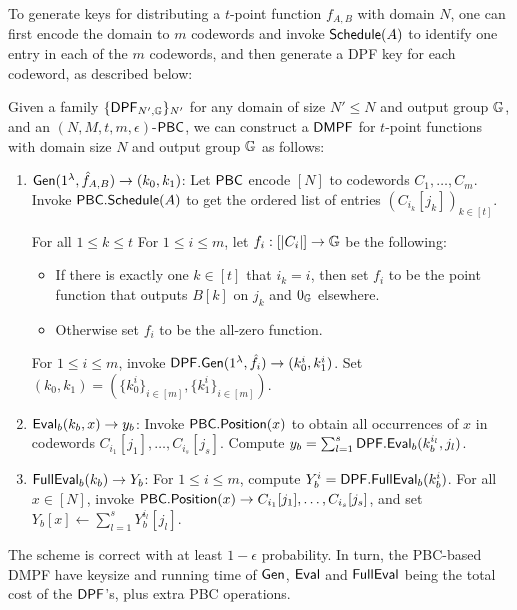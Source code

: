 To generate keys for distributing a $t$-point function $f_{A,B}$ with domain $N$, one can first encode the domain to $m$ codewords and invoke ${\sf Schedule}(A)$ to identify one entry in each of the $m$ codewords, and then generate a DPF key for each codeword, as described below: 

\begin{construction}\label{con:DMPF_PBC}
    Given a family $\{{\sf DPF}_{N',\mathbb{G}}\}_{N'}$ for any domain of size $N'\le N$ and output group $\mathbb{G}$, and an $(N,M,t,m,\epsilon)$-${\sf PBC}$, we can construct a ${\sf DMPF}$ for $t$-point functions with domain size $N$ and output group $\mathbb{G}$ as follows: 
  \begin{enumerate}[itemsep=5pt]
    \item ${\sf Gen}(1^\lambda, \hat{f}_{A,B})\rightarrow (k_0,k_1)$: Let ${\sf PBC}$ encode $[N]$ to codewords $C_1,\dots,C_m$. Invoke ${\sf PBC}.{\sf Schedule}(A)$ to get the ordered list of entries $\left(C_{i_k}[j_k]\right)_{k\in[t]}$.
    
    For all $1\le k\le t$ For $1\le i\le m$, let $f_i:[|C_i|]\rightarrow \mathbb{G}$ be the following: 
    \begin{itemize}
    \item If there is exactly one $k\in[t]$ that  $i_k = i$, then set $f_i$ to be the point function that outputs $B[k]$ on $j_k$ and $0_{\mathbb{G}}$ elsewhere. 
    \item Otherwise set $f_i$ to be the all-zero function. 
    \end{itemize}
    For $1\le i\le m$, invoke ${\sf DPF}.{\sf Gen}(1^\lambda, \hat{f}_i)\rightarrow (k_0^i,k_1^i)$. Set $(k_0,k_1)=(\{k_0^i\}_{i\in [m]}, \{k_1^i\}_{i\in [m]})$. 
    \item ${\sf Eval}_b(k_b,x)\rightarrow y_b$: Invoke ${\sf PBC}.{\sf Position}(x)$ to obtain all occurrences of $x$ in codewords $C_{i_1}[j_1],\dots,C_{i_s}[j_s]$. Compute $y_b=\sum_{l=1}^s{\sf DPF}.{\sf Eval}_b(k_b^{i_l},j_l)$. 
    \item ${\sf FullEval}_b(k_b)\rightarrow Y_b$: For $1\le i\le m$, compute $Y_b^i = {\sf DPF}.{\sf FullEval}_b(k_b^i)$. For all $x\in [N]$, invoke ${\sf PBC}.{\sf Position}(x)\rightarrow C_{i_1}[j_1],\dots,C_{i_s}[j_s]$, and set $Y_b[x]\gets \sum_{l=1}^sY_b^{i_l}[j_l]$. 
  \end{enumerate}
\end{construction}
The scheme is correct with at least $1-\epsilon$ probability. In turn, the PBC-based DMPF have keysize and running time of ${\sf Gen}$, ${\sf Eval}$ and ${\sf FullEval}$ being the total cost of the ${\sf DPF}$'s, plus extra PBC operations. 

